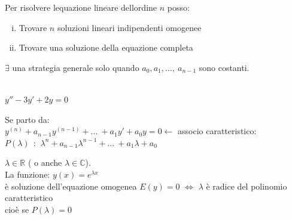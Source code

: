 \documentclass[a4paper, oneside]{article}
\begin{document}
\begin{proposition}
    Per risolvere lequazione lineare dellordine $n$ posso:\\
    \begin{enumerate}[i)]
        \item Trovare $n$ soluzioni lineari indipendenti omogenee
        \item Trovare una soluzione della equazione completa
    \end{enumerate}
     $\exists$ una strategia generale solo quando $a_0,a_1, ... , \ a_{n-1}$ sono costanti.\\
    \\
    \begin{example}
        $y'' - 3y' +2y = 0$\\
    \end{example}
    Se parto da:\\
    $y^{(n)}+ a_{n-1}y^{(n-1)}+ ... \ + a_1 y' + a_0 y = 0 \leftarrow$ associo caratteristico:\\
    $P(\lambda) \ \ $: $\ \lambda^n + a_{n-1} \lambda^{n-1} + ... \ + a_1 \lambda + a_0$\\
\end{proposition}
\begin{theorem}
     $\lambda \in \mathbb{R}$ ( o anche $\lambda \in \mathbb{C}$).\\
    La funzione: $y(x) = e^{\lambda x}$\\
    è soluzione dell'equazione omogenea $E(y) = 0$ $\Leftrightarrow$ $\lambda$ è radice del polinomio caratteristico\\
    cioè se $P(\lambda) = 0$\\
\end{theorem}
\end{document}
